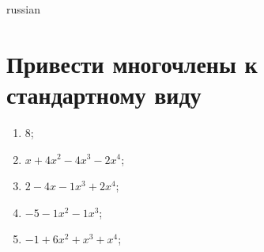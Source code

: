 \documentclass[a4paper]{article}
\begin{document}
\begin{otherlanguage*}{russian}

\section{Привести многочлены к стандартному виду}
\begin{enumerate}
\item $8$;
\item $x + 4x^2-4x^3-2x^4$;
\item $2-4x-1x^3 + 2x^4$;
\item $-5-1x^2-1x^3$;
\item $-1 + 6x^2 + x^3 + x^4$;
\end{enumerate}
\end{otherlanguage*}
\end{document}
